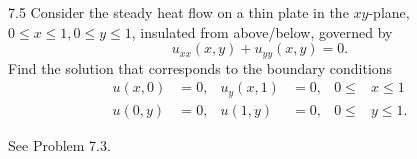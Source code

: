 \begin{problem}{7.5}
  Consider the steady heat flow on a thin plate in the $xy$-plane, $0 \leq x\leq 1, 0 \leq y \leq 1$, insulated from above/below, governed by
  \[ 
  u_{x x} (x,y) + u_{y y}(x,y) = 0 
  .\]
  Find the solution that corresponds to the boundary conditions
  \begin{align*}
    u(x,0) &= 0, & u_y(x,1) &= 0, & 0 \leq& x \leq 1 \\
    u(0,y) &= 0, & u(1,y) &= 0, & 0 \leq& y \leq 1
  .\end{align*}
\end{problem}

\begin{derivation}
  See Problem 7.3.
\end{derivation}

\newpage

